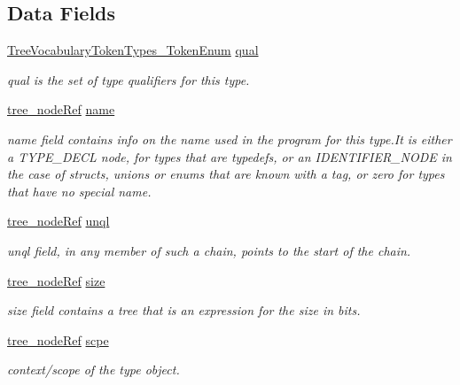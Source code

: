 \subsection*{Data Fields}
\begin{DoxyCompactItemize}
\item 
\hyperlink{token__interface_8hpp_a14502d0757789149f644966ca931b126}{Tree\+Vocabulary\+Token\+Types\+\_\+\+Token\+Enum} \hyperlink{structtype__node_afd6ecbc785e57218569bacd66feb53c8}{qual}
\begin{DoxyCompactList}\small\item\em qual is the set of type qualifiers for this type. \end{DoxyCompactList}\item 
\hyperlink{tree__node_8hpp_a6ee377554d1c4871ad66a337eaa67fd5}{tree\+\_\+node\+Ref} \hyperlink{structtype__node_a07eee969d966f75cb24817bbf90ea34f}{name}
\begin{DoxyCompactList}\small\item\em name field contains info on the name used in the program for this type.\+It is either a T\+Y\+P\+E\+\_\+\+D\+E\+CL node, for types that are typedefs, or an I\+D\+E\+N\+T\+I\+F\+I\+E\+R\+\_\+\+N\+O\+DE in the case of structs, unions or enums that are known with a tag, or zero for types that have no special name. \end{DoxyCompactList}\item 
\hyperlink{tree__node_8hpp_a6ee377554d1c4871ad66a337eaa67fd5}{tree\+\_\+node\+Ref} \hyperlink{structtype__node_aed3c94fa146e1d1f3df575ca18447b97}{unql}
\begin{DoxyCompactList}\small\item\em unql field, in any member of such a chain, points to the start of the chain. \end{DoxyCompactList}\item 
\hyperlink{tree__node_8hpp_a6ee377554d1c4871ad66a337eaa67fd5}{tree\+\_\+node\+Ref} \hyperlink{structtype__node_ade610e1eb89ba3790aadbb88de89ba81}{size}
\begin{DoxyCompactList}\small\item\em size field contains a tree that is an expression for the size in bits. \end{DoxyCompactList}\item 
\hyperlink{tree__node_8hpp_a6ee377554d1c4871ad66a337eaa67fd5}{tree\+\_\+node\+Ref} \hyperlink{structtype__node_aefd293d6db40bfc3caba9fa430294cd0}{scpe}
\begin{DoxyCompactList}\small\item\em context/scope of the type object. \end{DoxyCompactList}\item 

\end{DoxyCompactItemize}
